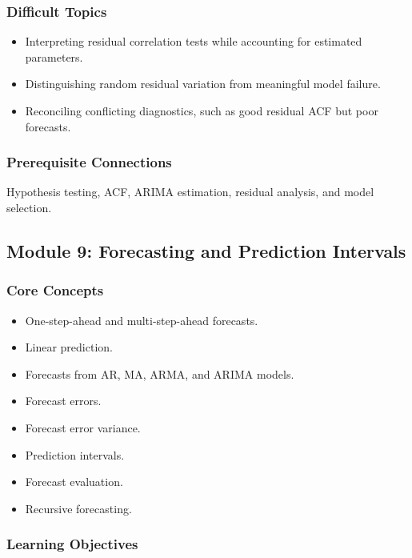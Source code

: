 \documentclass[11pt]{article}
\begin{document}
\subsubsection{Difficult Topics}

\begin{itemize}
    \item Interpreting residual correlation tests while accounting for estimated
    parameters.
    \item Distinguishing random residual variation from meaningful model
    failure.
    \item Reconciling conflicting diagnostics, such as good residual ACF but
    poor forecasts.
\end{itemize}

\subsubsection{Prerequisite Connections}

Hypothesis testing, ACF, ARIMA estimation, residual analysis, and model
selection.

\subsection{Module 9: Forecasting and Prediction Intervals}

\subsubsection{Core Concepts}

\begin{itemize}
    \item One-step-ahead and multi-step-ahead forecasts.
    \item Linear prediction.
    \item Forecasts from AR, MA, ARMA, and ARIMA models.
    \item Forecast errors.
    \item Forecast error variance.
    \item Prediction intervals.
    \item Forecast evaluation.
    \item Recursive forecasting.
\end{itemize}

\subsubsection{Learning Objectives}
\end{document}

